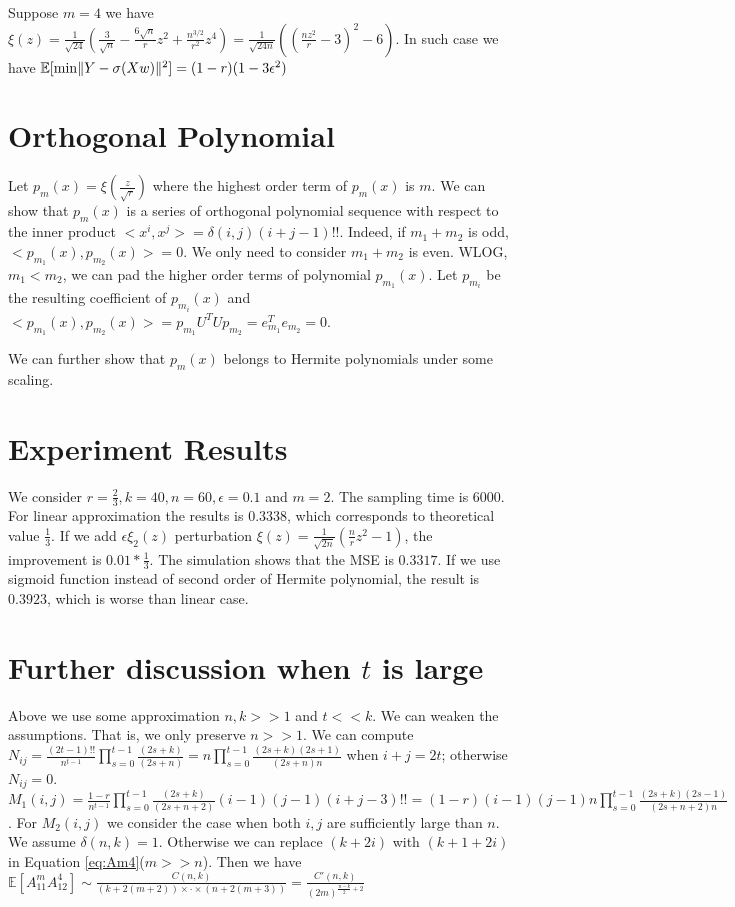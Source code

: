 \documentclass{article}
\DeclarePairedDelimiter\norm{\lVert}{\rVert}
\def\E{\mathbb{E}}
\begin{document}
Suppose  $ m = 4$ we have $ \xi(z) =
\frac{1}{\sqrt{24}}(\frac{3}{\sqrt{n}} - \frac{6\sqrt{n}}{r} z^2 +
\frac{n^{3/2}}{r^2}z^4)  = \frac{1}{\sqrt{24n}}((\frac{nz^2}{r} - 3)^2 - 6)$.
In such case we have $\E[\min \norm{Y - \sigma(Xw)}^2]=(1-r)(1-3\epsilon^2)$
\section{Orthogonal Polynomial}
Let $p_m(x) = \xi(\frac{z}{\sqrt{r}})$
where the highest order term of $p_m(x)$ is $m$.
We can show that $p_m(x)$ is a series of orthogonal polynomial sequence
with respect to the inner product
$<x^i, x^j> = \delta(i,j)(i+j-1)!!$.
Indeed, if $m_1 + m_2$ is odd, $<p_{m_1}(x), p_{m_2}(x)> = 0$.
We only need to consider $m_1 + m_2$ is even. WLOG, $m_1 < m_2$,
we can pad the higher order terms of polynomial $p_{m_1}(x)$.
Let $p_{m_i}$ be the resulting coefficient of $p_{m_i}(x)$
and $<p_{m_1}(x), p_{m_2}(x)> = p_{m_1}U^TUp_{m_2} = e^T_{m_1} e_{m_2} = 0$.

We can further show that $p_m(x)$ belongs to Hermite polynomials
under some scaling.

\section{Experiment Results}
We consider $r=\frac{2}{3}, k=40, n=60, \epsilon=0.1$ and $m=2$.
The sampling time is 6000.
For linear approximation the results is $0.3338$,
which corresponds to theoretical value $\frac{1}{3}$.
If we add $\epsilon \xi_2(z)$ perturbation
$\xi(z) = \frac{1}{\sqrt{2n}}(\frac{n}{r} z^2 -1)$,
the improvement is $0.01 * \frac{1}{3}$.
The simulation shows that the MSE is $0.3317$.
If we use sigmoid function instead of second order of Hermite polynomial,
the result is $0.3923$, which is worse than linear case.

\section{Further discussion when $t$ is large}
Above we use some approximation $n, k >> 1$ and $ t << k$.
We can weaken the assumptions. That is, we only preserve $ n >> 1$.
We can compute $N_{ij} =\frac{(2t-1)!!}{n^{t-1}} \prod_{s=0}^{t-1}
\frac{(2s+k)}{(2s+n)} = n
\prod_{s=0}^{t-1} \frac{(2s+k)(2s+1)}{(2s+n)n}$
when $i+j = 2t$; otherwise $N_{ij}=0$.
$M_1(i, j)=\frac{1-r}{n^{t-1}} \prod_{s=0}^{t-1}
\frac{(2s+k)}{(2s+n+2)} (i-1)(j-1) (i+j-3)!! =
(1-r)(i-1)(j-1)n \prod_{s=0}^{t-1} \frac{(2s+k)(2s-1)}{(2s+n+2)n}$.
For $M_2(i, j)$
we consider the case when both $i, j$ are sufficiently large than $n$.
We assume $\delta(n, k) = 1$.
Otherwise we can replace $(k+2i)$ with $(k+1+2i)$
in Equation \eqref{eq:Am4}($m>>n$).
Then we have $\E[A_{11}^m A_{12}^4] \sim \frac{C(n,k)}{(k+2(m+2)) \times
\cdot\times (n+2(m+3)) } = \frac{C'(n,k)}{(2m)^{\frac{n-k}{2}+2}}$
\end{document}
